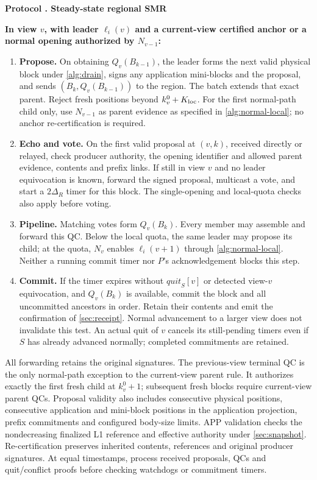 \documentclass[11pt,a4paper,onecolumn]{article}
\newcommand{\changed}[1]{{\color{red}#1}}
\newcounter{protocol}
\newenvironment{protocol}[2]{\refstepcounter{protocol}\label{#1}
\begin{mdframed}[nobreak=true,linewidth=.6pt,skipabove=9pt,skipbelow=9pt,
innertopmargin=7pt,innerbottommargin=7pt]\small
\noindent\textbf{Protocol \theprotocol. #2}\par\smallskip}{\end{mdframed}}
\begin{document}
\begin{protocol}{alg:steady}{Steady-state regional SMR}
\textbf{In view $v$, with leader $\ell_i(v)$ and a current-view certified anchor
\changed{or a normal opening authorized by $N_{v-1}$}:}
\begin{enumerate}[label=\textbf{S\arabic*.}]
\item \textbf{Propose.} On obtaining $Q_v(B_{k-1})$, the leader forms the
next valid physical block under \cref{alg:drain}, signs any application
mini-blocks and the proposal, and sends
$(B_k,Q_v(B_{k-1}))$ to the region. The batch extends that exact parent.
\changed{Reject fresh positions beyond $k_v^0+K_{\rm loc}$.
For the first normal-path child only, use $N_{v-1}$ as parent evidence as
specified in \cref{alg:normal-local}; no anchor re-certification is required.}
\item \textbf{Echo and vote.} On the first valid proposal at $(v,k)$, received
 directly or relayed, check producer authority, the
\changed{opening identifier and allowed parent evidence}, contents and prefix
links. If still in view $v$ and no leader equivocation is known, forward the
signed proposal, multicast a vote, and start a $2\Delta_R$ timer for this block.
\changed{The single-opening and local-quota checks also apply before voting.}
\item \textbf{Pipeline.} Matching votes form $Q_v(B_k)$.
\changed{Every member may assemble and forward this QC. Below the local
quota, the same leader may propose its child; at the quota, $N_v$ enables
$\ell_i(v+1)$ through \cref{alg:normal-local}.}
Neither a running commit timer nor $P$'s acknowledgement blocks this step.
\item \textbf{Commit.} If the timer expires
\changed{without $\mathit{quit}_S[v]$ or detected view-$v$ equivocation, and
$Q_v(B_k)$ is available}, commit the block and all uncommitted ancestors in
order. Retain their contents and emit the confirmation of \cref{sec:receipt}.
\changed{Normal advancement to a larger view does not invalidate this test.
An actual quit of $v$ cancels its still-pending timers even if $S$ has already
advanced normally; completed commitments are retained.}
\end{enumerate}
\end{protocol}

All forwarding retains the original signatures. The previous-view terminal
QC is the only normal-path exception to the current-view parent rule.
It authorizes exactly the first fresh child at $k_v^0+1$; subsequent fresh
blocks require current-view parent QCs. Proposal validity also includes
consecutive physical positions, consecutive application and mini-block
positions in the application projection, prefix commitments and configured
body-size limits. APP validation checks the nondecreasing finalized L1
reference and effective authority under \cref{sec:snapshot}. Re-certification
preserves inherited contents, references and original producer signatures.
At equal timestamps, process received proposals, QCs and quit/conflict
proofs before checking watchdogs or commitment timers.
\end{document}

